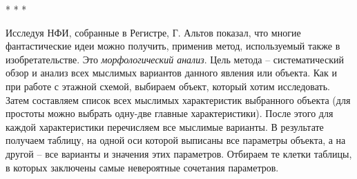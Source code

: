 \documentclass[11pt,a4paper]{article}
\begin{document}
\begin{center}
  * * *
\end{center}
Исследуя НФИ, собранные в Регистре, Г. Альтов показал, что многие
фантастические идеи можно получить, применив метод, используемый также в
изобретательстве. Это \emph{морфологический анализ}. Цель метода --
систематический обзор и анализ всех мыслимых вариантов данного явления или
объекта. Как и при работе с этажной схемой, выбираем объект, который хотим
исследовать. Затем составляем список всех мыслимых характеристик выбранного
объекта (для простоты можно выбрать одну-две главные характеристики). После
этого для каждой характеристики перечисляем все мыслимые варианты. В
результате получаем таблицу, на одной оси которой выписаны все параметры
объекта, а на другой -- все варианты и значения этих параметров. Отбираем те
клетки таблицы, в которых заключены самые невероятные сочетания параметров.
\end{document}
